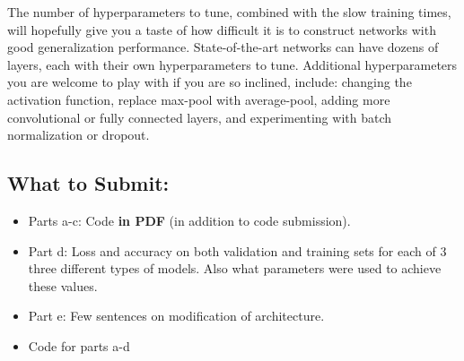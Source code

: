 \documentclass{article}
\begin{document}
\begin{bprob}
\begin{enumerate}
The number of hyperparameters to tune, combined with the slow training times, will hopefully give you a taste of how difficult it is to construct networks with good generalization performance. State-of-the-art networks can have dozens of layers, each with their own hyperparameters to tune. Additional hyperparameters you are welcome to play with if you are so inclined, include: changing the activation function, replace max-pool with average-pool, adding more convolutional or fully connected layers, and experimenting with batch normalization or dropout.
\end{enumerate}
\subsection*{What to Submit:}
\begin{itemize}
    \item Parts a-c: Code \textbf{in PDF} (in addition to code submission).
    \item Part d: Loss and accuracy on both validation and training sets for each of 3 three different types of models. Also what parameters were used to achieve these values.
    \item Part e: Few sentences on modification of architecture.
    \item Code for parts a-d
\end{itemize}
\end{bprob}

\clearpage
\end{document}
